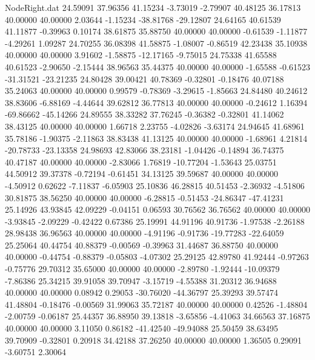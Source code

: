 \begin{filecontents}{NodeRight.dat}
  24.59091   37.96356   41.15234    -3.73019   -2.79907   40.48125   36.17813   40.00000   40.00000    2.03644   -1.15234  -38.81768  -29.12807
  24.64165   40.61539   41.11877    -0.39963    0.10174   38.61875   35.88750   40.00000   40.00000   -0.61539   -1.11877   -4.29261    1.09287
  24.70255   36.08398   41.58875    -1.08007   -0.86519   42.23438   35.10938   40.00000   40.00000    3.91602   -1.58875  -12.17165   -9.75015
  24.75338   41.65588   40.61523    -2.90650   -2.15444   38.96563   35.44375   40.00000   40.00000   -1.65588   -0.61523  -31.31521  -23.21235
  24.80428   39.00421   40.78369    -0.32801   -0.18476   40.07188   35.24063   40.00000   40.00000    0.99579   -0.78369   -3.29615   -1.85663
  24.84480   40.24612   38.83606    -6.88169   -4.44644   39.62812   36.77813   40.00000   40.00000   -0.24612    1.16394  -69.86662  -45.14266
  24.89555   38.33282   37.76245    -0.36382   -0.32801   41.14062   38.43125   40.00000   40.00000    1.66718    2.23755   -4.02826   -3.63174
  24.94645   41.68961   35.78186    -1.90375   -2.11863   38.83438   41.13125   40.00000   40.00000   -1.68961    4.21814  -20.78733  -23.13358
  24.98693   42.83066   38.23181    -1.04426   -0.14894   36.74375   40.47187   40.00000   40.00000   -2.83066    1.76819  -10.77204   -1.53643
  25.03751   44.50912   39.37378    -0.72194   -0.61451   34.13125   39.59687   40.00000   40.00000   -4.50912    0.62622   -7.11837   -6.05903
  25.10836   46.28815   40.51453    -2.36932   -4.51806   30.81875   38.56250   40.00000   40.00000   -6.28815   -0.51453  -24.86347  -47.41231
  25.14926   43.93845   42.09229    -0.04151    0.06593   30.76562   36.76562   40.00000   40.00000   -3.93845   -2.09229   -0.42422    0.67386
  25.19991   44.91196   40.91736    -1.97538   -2.26188   28.98438   36.96563   40.00000   40.00000   -4.91196   -0.91736  -19.77283  -22.64059
  25.25064   40.44754   40.88379    -0.00569   -0.39963   31.44687   36.88750   40.00000   40.00000   -0.44754   -0.88379   -0.05803   -4.07302
  25.29125   42.89780   41.92444    -0.97263   -0.75776   29.70312   35.65000   40.00000   40.00000   -2.89780   -1.92444  -10.09379   -7.86386
  25.34215   39.91058   39.70947    -3.15719   -4.55388   31.20312   36.94688   40.00000   40.00000    0.08942    0.29053  -30.76020  -44.36797
  25.39293   39.57474   41.48804    -0.18476   -0.00569   31.99063   35.72187   40.00000   40.00000    0.42526   -1.48804   -2.00759   -0.06187
  25.44357   36.88950   39.13818    -3.65856   -4.41063   34.66563   37.16875   40.00000   40.00000    3.11050    0.86182  -41.42540  -49.94088
  25.50459   38.63495   39.70909    -0.32801    0.20918   34.42188   37.26250   40.00000   40.00000    1.36505    0.29091   -3.60751    2.30064

\end{filecontents}
